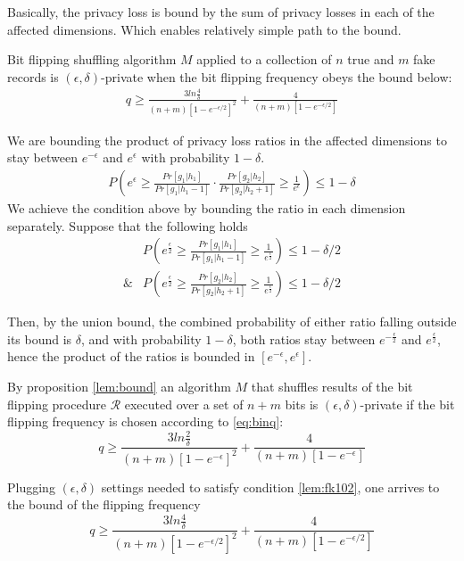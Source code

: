 \documentclass[11pt]{article}
\newcommand{\cR}{\mathcal{R}}
\begin{document}
Basically, the privacy loss is bound by the sum of privacy losses in each of the affected dimensions.  Which enables relatively simple path to the bound.   

\begin{prop}
Bit flipping shuffling algorithm $M$ applied to a collection of $n$ true and $m$ fake records is $(\epsilon, \delta)$-private when the bit flipping frequency obeys the bound below:
\begin{align}
q \ge \frac  { 3  ln\frac{4}{\delta}}  { (n + m) \left [ 1 - e^{-\epsilon/2}\right ] ^2}  + \frac{4}{(n + m) \left [ 1 - e^{-\epsilon/2}\right ] } 
\end{align}
\begin{pf}
We are bounding the product of privacy loss ratios in the affected dimensions to stay between $e^{-\epsilon}$ and $e^\epsilon$ with probability $1-\delta$.
\begin{align} \label{lem:fk101}
P \left (   e^\epsilon \ge \frac{  Pr[ g_1 | h_1]  } {  Pr[ g_1 | h_1 - 1]  } \cdot \frac{  Pr[ g_2 | h_2]  } {  Pr[ g_2 | h_2 + 1]  }  \ge \frac{1}{e^\epsilon} \right ) \le 1 - \delta
\end{align}
We achieve the condition above by bounding the ratio in each dimension separately.  Suppose that the following holds
\begin{align} \label{lem:fk102}
& P \left (   e^\frac{\epsilon}{2} \ge \frac{  Pr[ g_1 | h_1]  } {  Pr[ g_1 | h_1 - 1] }  \ge \frac{1}{e^\frac{\epsilon}{2}} \right ) \le 1 - \delta/2 \\
\& & P \left (   e^\frac{\epsilon}{2} \ge \frac{  Pr[ g_2 | h_2]  } {  Pr[ g_2 | h_2 + 1]  }  \ge \frac{1}{e^\frac{\epsilon}{2}} \right ) \le 1 - \delta/2 
\end{align}

Then, by the union bound, the combined probability of either ratio falling outside its bound is $\delta$, and with probability $1-\delta$, both ratios stay between $e^{-\frac{\epsilon}{2}}$ and $e^\frac{\epsilon}{2}$, hence the product of the ratios is bounded in $[ e^{-\epsilon}, e^\epsilon]$.   

By proposition \ref{lem:bound} an algorithm $M$ that shuffles results of the bit flipping procedure  $\cR$ executed over a set of $n+m$ bits is $(\epsilon, \delta)$-private if the bit flipping frequency is chosen according to \ref{eq:binq}:
\[ q \ge \frac  { 3  ln\frac{2}{\delta}}  { (n+m) \left [ 1 - e^{-\epsilon}\right ] ^2}  + \frac{4}{(n+m) \left [ 1 - e^{-\epsilon}\right ] } \]

Plugging  $(\epsilon, \delta)$ settings needed to satisfy condition \ref{lem:fk102}, one arrives to the  bound of the flipping frequency
\[ q \ge \frac  { 3  ln\frac{4}{\delta}}  { (n + m) \left [ 1 - e^{-\epsilon/2}\right ] ^2}  + \frac{4}{(n + m) \left [ 1 - e^{-\epsilon/2}\right ] } \]
\end{pf}
\end{prop}
\end{document}
